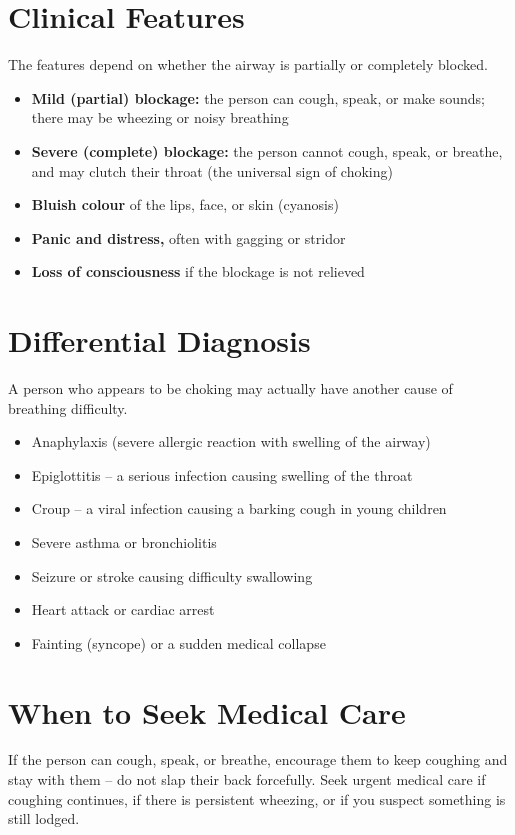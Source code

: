 \section*{Clinical Features}
The features depend on whether the airway is partially or completely blocked.

\begin{itemize}
    \item \textbf{Mild (partial) blockage:} the person can cough, speak, or make sounds; there may be wheezing or noisy breathing
    \item \textbf{Severe (complete) blockage:} the person cannot cough, speak, or breathe, and may clutch their throat (the universal sign of choking)
    \item \textbf{Bluish colour} of the lips, face, or skin (cyanosis)
    \item \textbf{Panic and distress,} often with gagging or stridor
    \item \textbf{Loss of consciousness} if the blockage is not relieved
\end{itemize}
\section*{Differential Diagnosis}
A person who appears to be choking may actually have another cause of breathing difficulty.

\begin{itemize}
    \item Anaphylaxis (severe allergic reaction with swelling of the airway)
    \item Epiglottitis -- a serious infection causing swelling of the throat
    \item Croup -- a viral infection causing a barking cough in young children
    \item Severe asthma or bronchiolitis
    \item Seizure or stroke causing difficulty swallowing
    \item Heart attack or cardiac arrest
    \item Fainting (syncope) or a sudden medical collapse
\end{itemize}

\section*{When to Seek Medical Care}
If the person can cough, speak, or breathe, encourage them to keep coughing and stay with them -- do not slap their back forcefully. Seek urgent medical care if coughing continues, if there is persistent wheezing, or if you suspect something is still lodged.

